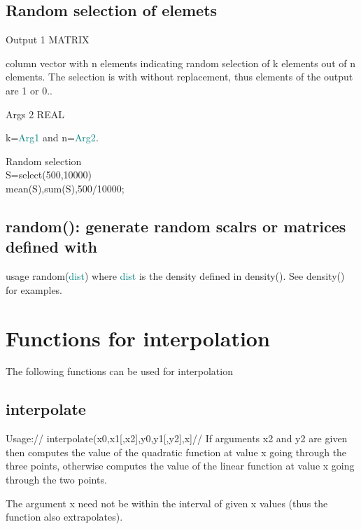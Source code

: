 \begin{itemize}
\subsection{Random selection of elemets}
\label{select}
\vspace{0.3cm}
\hline
\vspace{0.3cm}
\noindent Output \tabto{3cm} 1 \tabto{5cm}  MATRIX  \tabto{7cm}
\begin{changemargin}{3cm}{0cm}
\noindent column vector with n elements indicating random
selection of k
elements out of n elements. The selection is with without replacement,
thus elements of the output are 1 or 0..
\end{changemargin}
\vspace{0.3cm}
\hline
\vspace{0.3cm}
\noindent Args \tabto{3cm} 2 \tabto{5cm}  REAL \tabto{7cm}
\begin{changemargin}{3cm}{0cm}
\noindent  k=\textcolor{teal}{Arg1} and n=\textcolor{teal}{Arg2}.
\end {changemargin}
\hline
\vspace{0.2cm}
\begin{example}[selectex]Random selection\\
\label{selectex}
S=\textcolor{VioletRed}{select}(500,10000)\\
\textcolor{VioletRed}{mean}(S),\textcolor{VioletRed}{sum}(S),500/10000;
\end{example}
\subsection{\textcolor{VioletRed}{random}(): generate random scalrs or matrices defined with}
\label{random}
usage \textcolor{VioletRed}{random}(\textcolor{teal}{dist}) where \textcolor{teal}{dist} is the density defined in \textcolor{VioletRed}{density}().
See \textcolor{VioletRed}{density}() for examples.
\section{Functions for interpolation}
\label{inter}
The following functions can be used for interpolation
\subsection{interpolate}
\label{interpolate}
Usage://
\textcolor{VioletRed}{interpolate}(x0,x1[,x2],y0,y1[,y2],x]//
If arguments x2 and y2 are given then computes the value of the quadratic function at value
x going through the three points, otherwise computes the value of the linear function at value
x going through the two points.
\begin{note}
The argument x need not be within the interval of given x values (thus the function also
extrapolates).
\end{note}

\end{itemize}
